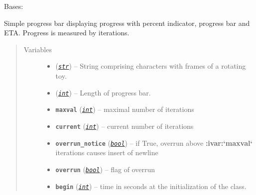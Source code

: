 \documentclass[a4paper,10pt,english]{sphinxmanual}
\begin{document}
\begin{fulllineitems}
\label{aqueduct.utils.clui:aqueduct.utils.clui.SimpleProgressBar}
Bases: \href{https://docs.python.org/2/library/functions.html\#object}{}

Simple progress bar displaying progress with percent indicator, progress bar and ETA.
Progress is measured by iterations.
\begin{quote}\begin{description}
\item[{Variables}] \leavevmode\begin{itemize}
\item {} 
{\hyperref[aqueduct.utils.clui:aqueduct.utils.clui.SimpleProgressBar.rotate]{}} (\href{https://docs.python.org/2/library/functions.html\#str}{\emph{\texttt{str}}}) -- String comprising characters with frames of a rotating toy.

\item {} 
{\hyperref[aqueduct.utils.clui:aqueduct.utils.clui.SimpleProgressBar.barlenght]{}} (\href{https://docs.python.org/2/library/functions.html\#int}{\emph{\texttt{int}}}) -- Length of progress bar.

\item {} 
\textbf{\texttt{maxval}} (\href{https://docs.python.org/2/library/functions.html\#int}{\emph{\texttt{int}}}) -- maximal number of iterations

\item {} 
\textbf{\texttt{current}} (\href{https://docs.python.org/2/library/functions.html\#int}{\emph{\texttt{int}}}) -- current number of iterations

\item {} 
\textbf{\texttt{overrun\_notice}} (\href{https://docs.python.org/2/library/functions.html\#bool}{\emph{\texttt{bool}}}) -- if True, overrun above {\color{red}\bfseries{}:ivar:{}`maxval{}`} iterations causes insert of newline

\item {} 
\textbf{\texttt{overrun}} (\href{https://docs.python.org/2/library/functions.html\#bool}{\emph{\texttt{bool}}}) -- flag of overrun

\item {} 
\textbf{\texttt{begin}} (\href{https://docs.python.org/2/library/functions.html\#int}{\emph{\texttt{int}}}) -- time in seconds at the initialization of the {\hyperref[aqueduct.utils.clui:aqueduct.utils.clui.SimpleProgressBar]{}} class.


\end{itemize}
\end{description}
\end{quote}
\end{fulllineitems}
\end{document}
